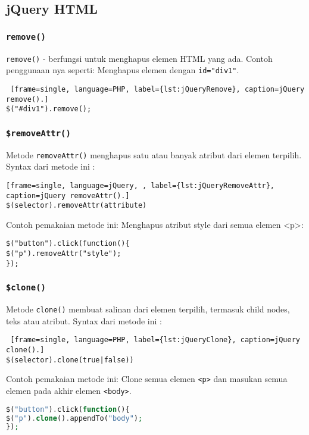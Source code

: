 \subsection{jQuery HTML}
\subsubsection{\texttt{remove()}}
\texttt{remove()} - berfungsi untuk menghapus elemen HTML yang ada. Contoh penggunaan nya seperti:
Menghapus elemen dengan \texttt{id="div1"}.
\begin{lstlisting} [frame=single, language=PHP, label={lst:jQueryRemove}, caption=jQuery remove().]
$("#div1").remove();
\end{lstlisting}

\subsubsection{\texttt{\$removeAttr()}}
Metode \texttt{removeAttr()} menghapus satu atau banyak atribut dari elemen terpilih.
Syntax dari metode ini :
\begin{lstlisting}[frame=single, language=jQuery, , label={lst:jQueryRemoveAttr}, caption=jQuery removeAttr().]
$(selector).removeAttr(attribute)
\end{lstlisting}

Contoh pemakaian metode ini: Menghapus atribut style dari semua elemen <p>:
\begin{lstlisting}[frame=single, language=jquery, label={lst:contohjQueryRemoveAttr}, caption=contoh jQuery removeAttr().]
$("button").click(function(){
$("p").removeAttr("style");
});
\end{lstlisting}

\subsubsection{\texttt{\$clone()}}
Metode \texttt{clone()} membuat salinan dari elemen terpilih, termasuk child nodes, teks atau atribut.
Syntax dari metode ini :
\begin{lstlisting} [frame=single, language=PHP, label={lst:jQueryClone}, caption=jQuery clone().]
$(selector).clone(true|false))
\end{lstlisting}

Contoh pemakaian metode ini: Clone semua elemen \texttt{<p>} dan masukan semua elemen pada akhir elemen \texttt{<body>}.
\begin{lstlisting}[frame=single, language=PHP, label={lst:contohjQueryClone}, caption=contoh jQuery clone().]
$("button").click(function(){
$("p").clone().appendTo("body");
});
\end{lstlisting}


